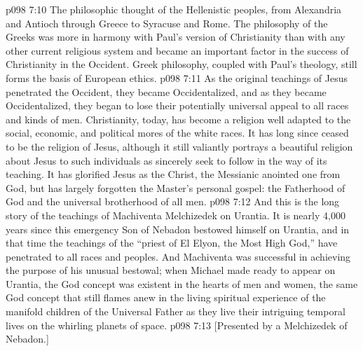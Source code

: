 \vs p098 7:10 \bibnobreakspace The philosophic thought of the Hellenistic peoples, from Alexandria and Antioch through Greece to Syracuse and Rome. The philosophy of the Greeks was more in harmony with Paul’s version of Christianity than with any other current religious system and became an important factor in the success of Christianity in the Occident. Greek philosophy, coupled with Paul’s theology, still forms the basis of European ethics.
\vs p098 7:11 \pc As the original teachings of Jesus penetrated the Occident, they became Occidentalized, and as they became Occidentalized, they began to lose their potentially universal appeal to all races and kinds of men. Christianity, today, has become a religion well adapted to the social, economic, and political mores of the white races. It has long since ceased to be the religion of Jesus, although it still valiantly portrays a beautiful religion about Jesus to such individuals as sincerely seek to follow in the way of its teaching. It has glorified Jesus as the Christ, the Messianic anointed one from God, but has largely forgotten the Master’s personal gospel: the Fatherhood of God and the universal brotherhood of all men.
\vs p098 7:12 \pc And this is the long story of the teachings of Machiventa Melchizedek on Urantia. It is nearly 4,000 years since this emergency Son of Nebadon bestowed himself on Urantia, and in that time the teachings of the “priest of El Elyon, the Most High God,” have penetrated to all races and peoples. And Machiventa was successful in achieving the purpose of his unusual bestowal; when Michael made ready to appear on Urantia, the God concept was existent in the hearts of men and women, the same God concept that still flames anew in the living spiritual experience of the manifold children of the Universal Father as they live their intriguing temporal lives on the whirling planets of space.
\vsetoff
\vs p098 7:13 [Presented by a Melchizedek of Nebadon.]
